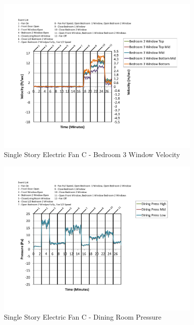 \documentclass{article}
\begin{document}
\begin{appendices}
	\begin{figure}[H]
		\centering
		\includegraphics[height=3.05in,trim=0.67in 1.1in 0.67in 0.8in,clip=true]{0_Images/Results_Charts/ColdFlow/Single_Story/Electric/C/Bedroom_3_Window_Velocity.pdf}
		\caption{Single Story Electric Fan C - Bedroom 3 Window Velocity}
	\end{figure}
 

	\begin{figure}[H]
		\centering
		\includegraphics[height=3.05in,trim=0.67in 1.1in 0.67in 0.8in,clip=true]{0_Images/Results_Charts/ColdFlow/Single_Story/Electric/C/Dining_Room_Pressure.pdf}
		\caption{Single Story Electric Fan C - Dining Room Pressure}
	\end{figure}
 
	\clearpage


\end{appendices}
\end{document}
